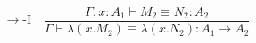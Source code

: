 \documentclass{article}
\begin{document}
\setlength\abovedisplayskip{0pt} %


\begin{preview}
\color[rgb]{0.000,0.000,0.004}\setcounter{equation}{0}%
\[\rightarrow\text{-I} \quad \frac{\Gamma, x : A_1 \vdash M_2 \equiv N_2 : A_2}{\Gamma \vdash \lambda(x.M_2) \equiv \lambda(x.N_2) : A_1 \rightarrow A_2}\]
\end{preview}
\end{document}
